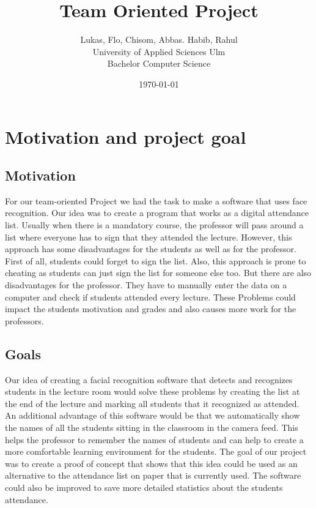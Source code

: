 \documentclass[12pt, a4paper]{article}
\title{Team Oriented Project}
\author{Lukas, Flo, Chisom, Abbas. Habib, Rahul \\
	University of Applied Sciences Ulm  \\
	Bachelor Computer Science 
	}
\date{\today}
\begin{document}
\maketitle




\newpage



\tableofcontents



\newpage

\section{Motivation and project goal}
\subsection{Motivation}
For our team-oriented Project we had the task to make a software that uses face recognition. Our idea was to create a program that works as a digital attendance list. Usually when there is a mandatory course, the professor will pass around a list where everyone has to sign that they attended the lecture. However, this approach has some disadvantages for the students as well as for the professor. First of all, students could forget to sign the list. Also, this approach is prone to cheating as students can just sign the list for someone else too. But there are also disadvantages for the professor. They have to manually enter the data on a computer and check if students attended every lecture. These Problems could impact the students motivation and grades and also causes more work for the professors. 

\subsection{Goals}
Our idea of creating a facial recognition software that detects and recognizes students in the lecture room would solve these problems by creating the list at the end of the lecture and marking all students that it recognized as attended. An additional advantage of this software would be that we automatically show the names of all the students sitting in the classroom in the camera feed. This helps the professor to remember the names of students and can help to create a more comfortable learning environment for the students. The goal of our project was to create a proof of concept that shows that this idea could be used as an alternative to the attendance list on paper that is currently used. The software could also be improved to save more detailed statistics about the students attendance. 
\end{document}
